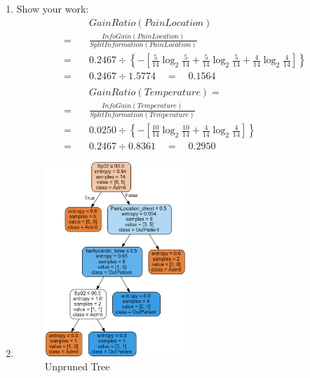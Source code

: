 \documentclass{article}
\begin{document}
\begin{enumerate}[label=\alph*.]
            \item %
            Show your work:
            \begin{equation*}
            	\begin{split}
                &\mathit{GainRatio}(\mathit{PainLocation})
                \\=\quad&\mathit{
                \frac{InfoGain(PainLocation)}
                {SplitInformation(PainLocation)}}\\
                =\quad&0.2467\div\left\{-[
                \frac{5}{14}\log_2\frac{5}{14}+
                \frac{5}{14}\log_2\frac{5}{14}+
                \frac{4}{14}\log_2\frac{4}{14}]\right\}\\
                =\quad&0.2467\div1.5774\quad
                =\quad0.1564\\\\
                &\mathit{GainRatio}(\mathit{Temperature}) =
                \\=\quad&\mathit{
                \frac{InfoGain(Temperature)}
                {SplitInformation(Temperature)}}\\
                =\quad&0.0250\div\left\{-[
                \frac{10}{14}\log_2\frac{10}{14}+
                \frac{4}{14}\log_2\frac{4}{14}]\right\}\\
                =\quad&0.2467\div0.8361\quad
                =\quad0.2950
                \end{split}
            \end{equation*}
            
            \item %
			\begin{figure}[h]
			\centering
			\includegraphics[width=0.5\textwidth]
            {UnprunedTree.png}
            \caption{Unpruned Tree}
            \label{fig:PrunedTree}
			\end{figure}
            

\end{enumerate}
\end{document}
